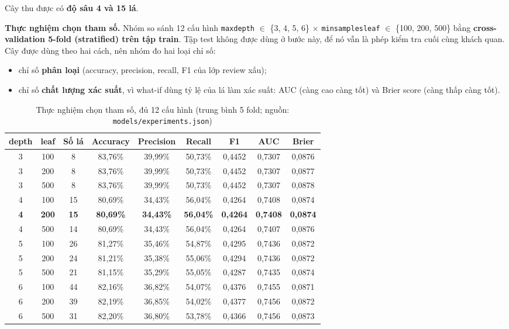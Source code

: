 \documentclass[12pt,a4paper]{report}
\newcommand{\code}[1]{\texttt{#1}}
\renewcommand{\_}{\oldunderscore\allowbreak}
\begin{document}
Cây thu được có \textbf{độ sâu 4 và 15 lá}.

\textbf{Thực nghiệm chọn tham số.} Nhóm so sánh 12 cấu hình \code{max\_depth} $\in$ \{3, 4, 5, 6\} $\times$ \code{min\_samples\_leaf} $\in$ \{100, 200, 500\} bằng \textbf{cross-validation 5-fold (stratified) trên tập train}. Tập test không được dùng ở bước này, để nó vẫn là phép kiểm tra cuối cùng khách quan. Cây được dùng theo hai cách, nên nhóm đo hai loại chỉ số:
\begin{itemize}
\item chỉ số \textbf{phân loại} (accuracy, precision, recall, F1 của lớp review xấu);
\item chỉ số \textbf{chất lượng xác suất}, vì what-if dùng tỷ lệ của lá làm xác suất: AUC (càng cao càng tốt) và Brier score (càng thấp càng tốt).
\end{itemize}

\begin{table}[H]
\centering\small
\setlength{\tabcolsep}{4pt}
\caption{Thực nghiệm chọn tham số, đủ 12 cấu hình (trung bình 5 fold; nguồn: \code{models/experiments.json})}
\begin{tabular}{ccccccccc}
\toprule
depth & leaf & Số lá & Accuracy & Precision & Recall & F1 & AUC & Brier \\
\midrule
3 & 100 & 8 & 83,76\% & 39,99\% & 50,73\% & 0,4452 & 0,7307 & 0,0876 \\
3 & 200 & 8 & 83,76\% & 39,99\% & 50,73\% & 0,4452 & 0,7307 & 0,0877 \\
3 & 500 & 8 & 83,76\% & 39,99\% & 50,73\% & 0,4452 & 0,7307 & 0,0878 \\
4 & 100 & 15 & 80,69\% & 34,43\% & 56,04\% & 0,4264 & 0,7408 & 0,0874 \\
\textbf{4} & \textbf{200} & \textbf{15} & \textbf{80,69\%} & \textbf{34,43\%} & \textbf{56,04\%} & \textbf{0,4264} & \textbf{0,7408} & \textbf{0,0874} \\
4 & 500 & 14 & 80,69\% & 34,43\% & 56,04\% & 0,4264 & 0,7407 & 0,0876 \\
5 & 100 & 26 & 81,27\% & 35,46\% & 54,87\% & 0,4295 & 0,7436 & 0,0872 \\
5 & 200 & 24 & 81,21\% & 35,38\% & 55,06\% & 0,4294 & 0,7436 & 0,0872 \\
5 & 500 & 21 & 81,15\% & 35,29\% & 55,05\% & 0,4287 & 0,7435 & 0,0874 \\
6 & 100 & 44 & 82,16\% & 36,82\% & 54,07\% & 0,4376 & 0,7455 & 0,0871 \\
6 & 200 & 39 & 82,19\% & 36,85\% & 54,02\% & 0,4377 & 0,7456 & 0,0872 \\
6 & 500 & 31 & 82,20\% & 36,80\% & 53,78\% & 0,4366 & 0,7456 & 0,0873 \\
\bottomrule
\end{tabular}
\end{table}
\end{document}

